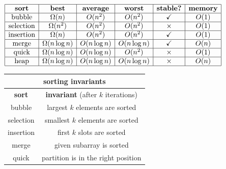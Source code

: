 \documentclass[10pt, landscape]{article}
\newenvironment{tightcenter}{%
  \setlength\topsep{0pt}
  \setlength\parskip{0pt}
  \begin{center}
}{%
  \end{center}
}
\begin{document}

\begin{minipage}{0.5\linewidth}   
    \begin{tightcenter}
        $\begin{array}{| c | c | c | c | c | c |}
            \hline\textbf{sort} & \textbf{best} & \textbf{average} & \textbf{worst} & \textbf{stable?} & \textbf{memory}
    
            \\\hline\text{bubble} & \Omega(n) & O(n^2) & O(n^2) & \checkmark & O(1)
            
            \\\hline\text{selection} & \Omega(n^2) & O(n^2) & O(n^2) & \times & O(1)
            
            \\\hline\text{insertion} & \Omega(n) & O(n^2) & O(n^2) & \checkmark & O(1)
            
            \\\hline\text{merge} & \Omega(n\log n) & O(n\log n) & O(n\log n) & \checkmark & O(n)
            
            \\\hline\text{quick} & \Omega(n\log n) & O(n\log n) & O(n^2) & \times & O(1)

            \\\hline\text{heap} & \Omega(n\log n) & O(n\log n) & O(n\log n) & \times & O(n)
            \\\hline
        \end{array} 
        $\
        \begin{tabular}{| c | c |}
            \multicolumn{2}{c}{sorting invariants}
            \\\hline\textbf{sort} & \textbf{invariant} (after $k$ iterations)
            \\\hline bubble & largest $k$ elements are sorted
            \\\hline selection & smallest $k$ elements are sorted
            \\\hline insertion & first $k$ slots are sorted
            \\\hline merge & given subarray is sorted
            \\\hline quick & partition is in the right position
            \\\hline
        \end{tabular} 
    \end{tightcenter}
\end{minipage}
\end{document}
